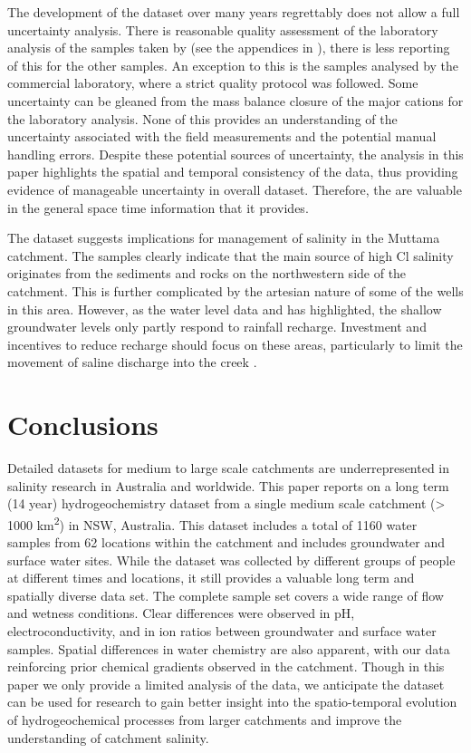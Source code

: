 \documentclass[, manuscript]{copernicus}
\begin{document}
The development of the dataset over many years regrettably does not
allow a full uncertainty analysis. There is reasonable quality
assessment of the laboratory analysis of the samples taken by
\citet{Akter2018} (see the appendices in \citet{Akter2018}), there is
less reporting of this for the other samples. An exception to this is
the samples analysed by the commercial laboratory, where a strict
quality protocol was followed. Some uncertainty can be gleaned from the
mass balance closure of the major cations for the laboratory analysis.
None of this provides an understanding of the uncertainty associated
with the field measurements and the potential manual handling errors.
Despite these potential sources of uncertainty, the analysis in this
paper highlights the spatial and temporal consistency of the data, thus
providing evidence of manageable uncertainty in overall dataset.
Therefore, the are valuable in the general space time information that
it provides.

The dataset suggests implications for management of salinity in the
Muttama catchment. The samples clearly indicate that the main source of
high Cl salinity originates from the sediments and rocks on the
northwestern side of the catchment. This is further complicated by the
artesian nature of some of the wells in this area. However, as the water
level data and \citet{Akter2018} has highlighted, the shallow
groundwater levels only partly respond to rainfall recharge. Investment
and incentives to reduce recharge should focus on these areas,
particularly to limit the movement of saline discharge into the creek
\citep{Akter2018}.

\section{Conclusions}

Detailed datasets for medium to large scale catchments are
underrepresented in salinity research in Australia and worldwide. This
paper reports on a long term (14 year) hydrogeochemistry dataset from a
single medium scale catchment (\textgreater{} 1000
km\textsuperscript{2}) in NSW, Australia. This dataset includes a total
of 1160 water samples from 62 locations within the catchment and
includes groundwater and surface water sites. While the dataset was
collected by different groups of people at different times and
locations, it still provides a valuable long term and spatially diverse
data set. The complete sample set covers a wide range of flow and
wetness conditions. Clear differences were observed in pH,
electroconductivity, and in ion ratios between groundwater and surface
water samples. Spatial differences in water chemistry are also apparent,
with our data reinforcing prior chemical gradients observed in the
catchment. Though in this paper we only provide a limited analysis of
the data, we anticipate the dataset can be used for research to gain
better insight into the spatio-temporal evolution of hydrogeochemical
processes from larger catchments and improve the understanding of
catchment salinity.
\end{document}
